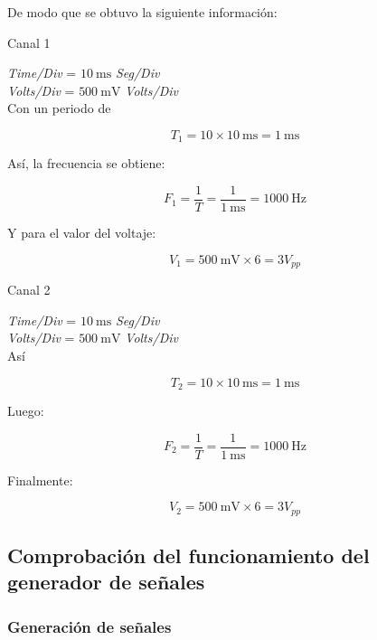 \documentclass[a4paper,12pt]{article}
\begin{document}
De modo que se obtuvo la siguiente información:

\begin{multicols}{2}

\begin{center} Canal 1 \end{center}

\emph{Time/Div} = $\SI{10}{\milli\second}$ \emph{Seg/Div} \\
\emph{Volts/Div} = $\SI{500}{\milli\volt}$ \emph{Volts/Div}\\

Con un periodo de

\[T_1 = 10 \times \SI{10}{\milli\second} = \SI{1}{\milli\second}\]

Así, la frecuencia se obtiene:

\[F_1 = \frac{1}{T} = \frac{1}{\SI{1}{\milli\second}} = \SI{1000}{\Hz}\]

Y para el valor del voltaje:

\[V_1 = \SI{500}{\milli\volt} \times 6 = 3 V_{pp}\]

\columnbreak

\begin{center} Canal 2 \end{center}
\emph{Time/Div} = $\SI{10}{\milli\second}$ \emph{Seg/Div} \\
\emph{Volts/Div} = $\SI{500}{\milli\volt}$ \emph{Volts/Div}\\

Así

\[T_2 = 10 \times \SI{10}{\milli\second} = \SI{1}{\milli\second}\]

Luego:

\[F_2 = \frac{1}{T} = \frac{1}{\SI{1}{\milli\second}} = \SI{1000}{\Hz}\]

Finalmente:

\[V_2 = \SI{500}{\milli\volt} \times 6 = 3 V_{pp}\]

\end{multicols}



\subsection{Comprobación del funcionamiento del generador de señales}

\subsubsection{Generación de señales}
\end{document}
